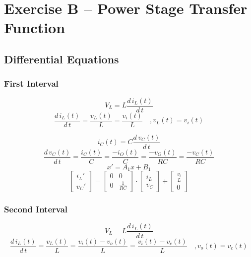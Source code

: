 \section{Exercise B -- Power Stage Transfer Function}

\subsection{Differential Equations}
\subsubsection{First Interval}
\[ 
	V_L
	= L \frac{d\,i_L(t)}{d\,t}
\]
\[
	\frac{d\,i_L(t)}{d\,t}
	= \frac{v_L(t)}{L}
	= \frac{v_i(t)}{L}
	\quad, v_L(t) = v_i(t)
\]

\[
	i_C(t) 
	= C \frac{d\,v_C(t)}{d\,t}
\]
\[
	\frac{d\,v_C(t)}{d\,t}
	= \frac{i_C(t)}{C}
	= \frac{-i_O(t)}{C}
	= \frac{-v_O(t)}{R C}
	= \frac{-v_C(t)}{R C}
\]
\[
	x' = A_1 x + B_1
\]
\[
	\begin{bmatrix}
		{i_L}' \\
		{v_C}'
	\end{bmatrix}
	=
	\begin{bmatrix}
		0 	& 0 \\
		0	& \frac{1}{R C}
	\end{bmatrix}
	\cdot
	\begin{bmatrix}
		i_L \\
		v_C
	\end{bmatrix}
	+
	\begin{bmatrix}
		\frac{v_i}{L} \\
		0
	\end{bmatrix}
\]

\subsubsection{Second Interval}
\[ 
	V_L
	= L \frac{d\,i_L(t)}{d\,t}
\]
\[
	\frac{d\,i_L(t)}{d\,t}
	= \frac{v_L(t)}{L}
	= \frac{v_i(t) - v_o(t)}{L}
	= \frac{v_i(t) - v_c(t)}{L}
	\quad, v_o(t) = v_c(t)
\]

